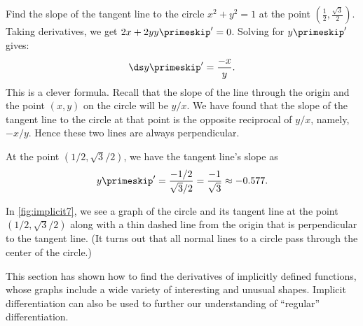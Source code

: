 \begin{example}\label{ex_implicit7}%
Find the slope of the tangent line to the circle $x^2+y^2=1$ at the point $(\frac12, \frac{\sqrt3}2)$.
\solution
Taking derivatives, we get $2x+2yy\primeskip'=0$.  Solving for $y\primeskip'$  gives: \[\ds y\primeskip' = \frac{-x}{y}.\]
This is a clever formula. Recall that the slope of the line through the origin and the point $(x,y)$ on the circle will be $y/x$. We have found that the slope of the tangent line to the circle at that point is the opposite reciprocal of $y/x$, namely, $-x/y$. Hence these two lines are always perpendicular.

At the point $(1/2, \sqrt{3}/2)$, we have the tangent line's slope as
\[y\primeskip' = \frac{-1/2}{\sqrt{3}/2} = \frac{-1}{\sqrt{3}} \approx -0.577.\]

In \autoref{fig:implicit7}, we see a graph of the circle and its tangent line at the point $(1/2,\sqrt{3}/2)$ along with a thin dashed line from the origin that is perpendicular to the tangent line. (It turns out that all normal lines to a circle pass through the center of the circle.)

\end{example}

This section has shown how to find the derivatives of implicitly defined functions, whose graphs include a wide variety of interesting and unusual shapes. Implicit differentiation can also be used to further our understanding of ``regular'' differentiation. 

